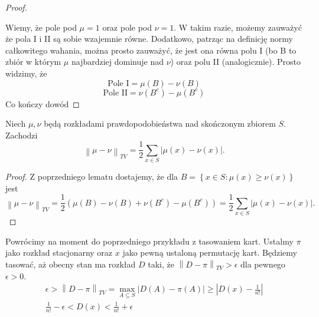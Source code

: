 \begin{proof}
\begin{center}
	\end{center}

	Wiemy, że pole pod \(\mu = 1\) oraz pole pod \(\nu = 1\). W takim razie, możemy zauważyć że pola I i II są sobie wzajemnie równe. Dodatkowo, patrząc na definicję normy całkowitego wahania, można prosto zauważyć, że jest ona równa polu I (bo B to zbiór w którym \(\mu\) najbardziej dominuje nad \(\nu\)) oraz polu II (analogicznie). Prosto widzimy, że
	\[
		\text{Pole I} = \mu(B) - \nu(B)
	\]
	\[
		\text{Pole II} = \nu(B^c) - \mu(B^c)
	\]
	Co kończy dowód
\end{proof}

\begin{lemma}
	Niech \(\mu, \nu\) będą rozkładami prawdopodobieństwa nad skończonym zbiorem \(S\). Zachodzi
	\[ \left\|\mu-\nu\right\|_{TV} = \frac{1}{2} \sum_{x \in S}^{} \left|\mu\left( x  \right) - \nu\left( x \right) \right| .\]
\end{lemma}
\begin{proof}
	Z poprzedniego lematu dostajemy, że dla \(B = \left\{ x \in  S : \mu\left( x  \right) \ge \nu\left( x \right)  \right\} \) jest
	\[ \left\|\mu-\nu\right\|_{TV} = \frac{1}{2} \left( \mu\left( B  \right) - \nu\left( B  \right) + \nu\left( B^{c} \right) - \mu\left( B^{c} \right)  \right) = \frac{1}{2} \sum_{x \in S}^{} \left|\mu\left( x  \right) - \nu\left( x  \right) \right|. \]
\end{proof}

\begin{example}
	Powrócimy na moment do poprzedniego przykładu z tasowaniem kart. Ustalmy \(\pi\) jako rozkład stacjonarny oraz \(x\) jako pewną ustaloną permutację kart.
	Będziemy tasować, aż obecny stan ma rozkład \(D\) taki, że \(\left\|D-\pi\right\|_{TV} > \epsilon\) dla pewnego \(\epsilon > 0\).
	\begin{align*}
		\epsilon > \left\|D-\pi\right\|_{TV} = \max_{A \subseteq S}\left|D(A) - \pi(A)\right|
		\ge \left|D(x) - \frac{1}{n!}\right| \\
		\frac{1}{n!} - \epsilon < D(x) < \frac{1}{n!} + \epsilon
	\end{align*}
\end{example}

